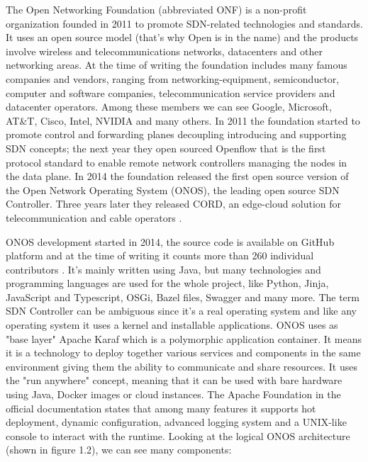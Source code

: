 \documentclass[a4paper,10pt]{memoir}
\begin{document}
The Open Networking Foundation (abbreviated ONF) is a non-profit organization founded in 2011 to promote SDN-related technologies and standards. It uses an open source model (that's why Open is in the name) and the products involve wireless and telecommunications networks, datacenters and other networking areas. At the time of writing the foundation includes many famous companies and vendors, ranging from networking-equipment, semiconductor, computer and software companies, telecommunication service providers and datacenter operators. Among these members we can see Google, Microsoft, AT\&T, Cisco, Intel, NVIDIA and many others. In 2011 the foundation started to promote control and forwarding planes decoupling introducing and supporting SDN concepts; the next year they open sourced Openflow that is the first protocol standard to enable remote network controllers managing the nodes in the data plane. In 2014 the foundation 
 released the first open source version of the Open Network Operating System (ONOS), the leading open source SDN Controller. Three years later they released CORD, an edge-cloud solution for telecommunication and cable operators \cite{opennetworking-org}.

ONOS development started in 2014, the source code is available on GitHub platform and at the time of writing it counts more than 260 individual contributors \cite{github-onos}. It's mainly written using Java, but many technologies and programming languages are used for the whole project, like Python, Jinja, JavaScript and Typescript, OSGi, Bazel files, Swagger and many more. The term SDN Controller can be ambiguous since it's a real operating system and like any operating system it uses a kernel and installable applications. ONOS uses as "base layer" Apache Karaf which is a polymorphic application container. It means it is a technology to deploy together various services and components in the same environment giving them the ability to communicate and share resources. It uses the "run anywhere" concept, meaning that it can be used with bare hardware using Java, Docker images or cloud instances. The Apache Foundation in the official documentation states that among many features it supports hot deployment, dynamic configuration, advanced logging system and a UNIX-like console to interact with the runtime. Looking at the logical ONOS architecture (shown in figure 1.2), we can see many components:
\end{document}
